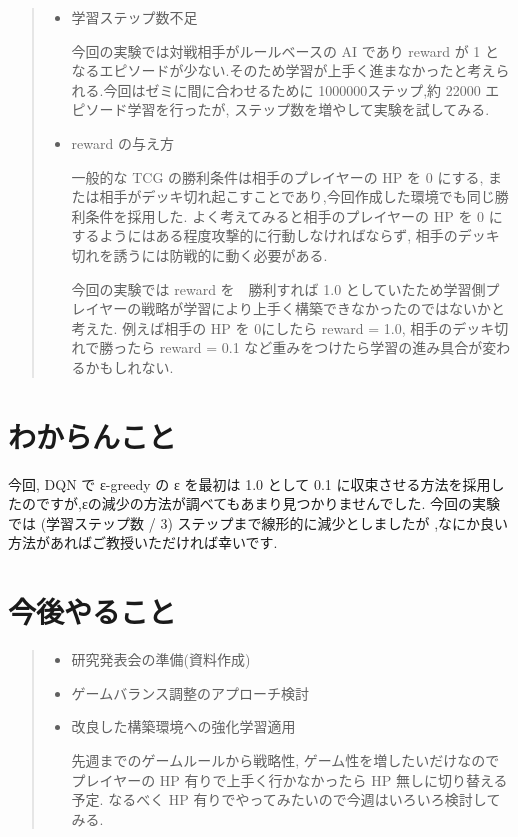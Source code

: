 \documentclass{jarticle}     %
\begin{document}
\begin{quote}
  \begin{itemize}
   \item 学習ステップ数不足
   \par
   今回の実験では対戦相手がルールベースの AI であり reward が 1 となるエピソードが少ない.そのため学習が上手く進まなかったと考えられる.今回はゼミに間に合わせるために 1000000ステップ,約 22000 エピソード学習を行ったが, ステップ数を増やして実験を試してみる.
   \item reward の与え方
   \par
   一般的な TCG の勝利条件は相手のプレイヤーの HP を 0 にする, または相手がデッキ切れ起こすことであり,今回作成した環境でも同じ勝利条件を採用した.
   よく考えてみると相手のプレイヤーの HP を 0 にするようにはある程度攻撃的に行動しなければならず, 相手のデッキ切れを誘うには防戦的に動く必要がある.
   \par
   今回の実験では reward を　勝利すれば 1.0 としていたため学習側プレイヤーの戦略が学習により上手く構築できなかったのではないかと考えた. 例えば相手の HP を 0にしたら reward = 1.0, 相手のデッキ切れで勝ったら reward = 0.1 など重みをつけたら学習の進み具合が変わるかもしれない.
  \end{itemize}
 \end{quote}

\section{わからんこと}
今回, DQN で ε-greedy の ε を最初は 1.0 として 0.1 に収束させる方法を採用したのですが,εの減少の方法が調べてもあまり見つかりませんでした. 今回の実験では (学習ステップ数 / 3) ステップまで線形的に減少としましたが ,なにか良い方法があればご教授いただければ幸いです.

\section{今後やること}
\begin{quote}
  \begin{itemize}
   \item 研究発表会の準備(資料作成)
   \item ゲームバランス調整のアプローチ検討
   \item 改良した構築環境への強化学習適用
   \par
   先週までのゲームルールから戦略性, ゲーム性を増したいだけなのでプレイヤーの HP 有りで上手く行かなかったら HP 無しに切り替える予定. なるべく HP 有りでやってみたいので今週はいろいろ検討してみる.
  \end{itemize}
 \end{quote}



\end{document}
